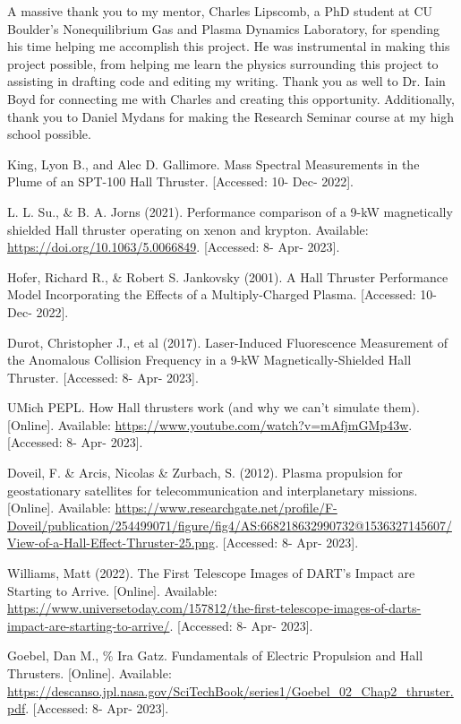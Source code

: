 \documentclass[letterpaper, 10 pt, conference]{ieeeconf}  %
\begin{document}
A massive thank you to my mentor, Charles Lipscomb, a PhD student at CU Boulder’s Nonequilibrium Gas and Plasma Dynamics Laboratory, for spending his time helping me accomplish this project. He was instrumental in making this project possible, from helping me learn the physics surrounding this project to assisting in drafting code and editing my writing. Thank you as well to Dr. Iain Boyd for connecting me with Charles and creating this opportunity. Additionally, thank you to Daniel Mydans for making the Research Seminar course at my high school possible.




\begin{thebibliography}{99}

 King, Lyon B., and Alec D. Gallimore. Mass Spectral Measurements in the Plume of an SPT-100 Hall Thruster. [Accessed: 10- Dec- 2022].

 L. L. Su., \& B. A. Jorns (2021). Performance comparison of a 9-kW magnetically shielded Hall thruster operating on xenon and krypton. Available: \url{https://doi.org/10.1063/5.0066849}. [Accessed: 8- Apr- 2023].

 Hofer, Richard R., \& Robert S. Jankovsky (2001). A Hall Thruster Performance Model Incorporating the Effects of a Multiply-Charged Plasma. [Accessed: 10- Dec- 2022].

 Durot, Christopher J., et al (2017). Laser-Induced Fluorescence Measurement of the Anomalous Collision Frequency in a 9-kW Magnetically-Shielded Hall Thruster. [Accessed: 8- Apr- 2023].

 UMich PEPL. How Hall thrusters work (and why we can’t simulate them). [Online]. Available: \url{https://www.youtube.com/watch?v=mAfjmGMp43w}. [Accessed: 8- Apr- 2023].

 Doveil, F. \& Arcis, Nicolas \& Zurbach, S. (2012). Plasma propulsion for geostationary satellites for telecommunication and interplanetary missions. [Online]. Available: \url{https://www.researchgate.net/profile/F-Doveil/publication/254499071/figure/fig4/AS:668218632990732@1536327145607/View-of-a-Hall-Effect-Thruster-25.png}. [Accessed: 8- Apr- 2023].

 Williams, Matt (2022). The First Telescope Images of DART's Impact are Starting to Arrive. [Online]. Available: \url{https://www.universetoday.com/157812/the-first-telescope-images-of-darts-impact-are-starting-to-arrive/}. [Accessed: 8- Apr- 2023].

 Goebel, Dan M., \% Ira Gatz. Fundamentals of Electric Propulsion and Hall Thrusters. [Online]. Available: \url{https://descanso.jpl.nasa.gov/SciTechBook/series1/Goebel_02_Chap2_thruster.pdf}. [Accessed: 8- Apr- 2023].

\end{thebibliography}
\end{document}
